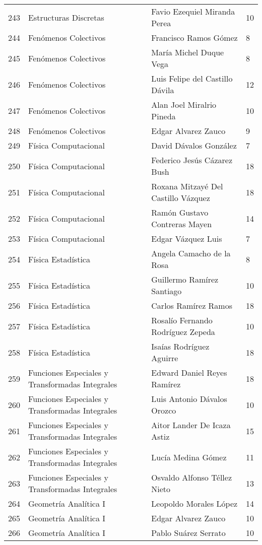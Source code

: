 \begin{table}[ht]
\begin{tabular}{rlll}
  243 & Estructuras Discretas & Favio Ezequiel Miranda Perea & 10 \\ 
  244 & Fenómenos Colectivos & Francisco Ramos Gómez & 8 \\ 
  245 & Fenómenos Colectivos & María Michel Duque Vega & 8 \\ 
  246 & Fenómenos Colectivos & Luis Felipe del Castillo Dávila & 12 \\ 
  247 & Fenómenos Colectivos & Alan Joel Miralrio Pineda & 10 \\ 
  248 & Fenómenos Colectivos & Edgar Alvarez Zauco & 9 \\ 
  249 & Física Computacional & David Dávalos González & 7 \\ 
  250 & Física Computacional & Federico Jesús Cázarez Bush & 18 \\ 
  251 & Física Computacional & Roxana Mitzayé Del Castillo Vázquez & 18 \\ 
  252 & Física Computacional & Ramón Gustavo Contreras Mayen & 14 \\ 
  253 & Física Computacional & Edgar Vázquez Luis & 7 \\ 
  254 & Física Estadística & Angela Camacho de la Rosa & 8 \\ 
  255 & Física Estadística & Guillermo Ramírez Santiago & 10 \\ 
  256 & Física Estadística & Carlos Ramírez Ramos & 18 \\ 
  257 & Física Estadística & Rosalío Fernando Rodríguez Zepeda & 10 \\ 
  258 & Física Estadística & Isaías Rodríguez Aguirre & 18 \\ 
  259 & Funciones Especiales y Transformadas Integrales & Edward Daniel Reyes Ramírez & 18 \\ 
  260 & Funciones Especiales y Transformadas Integrales & Luis Antonio Dávalos Orozco & 10 \\ 
  261 & Funciones Especiales y Transformadas Integrales & Aitor Lander De Icaza Astiz & 15 \\ 
  262 & Funciones Especiales y Transformadas Integrales & Lucía Medina Gómez & 11 \\ 
  263 & Funciones Especiales y Transformadas Integrales & Osvaldo Alfonso Téllez Nieto & 13 \\ 
  264 & Geometría Analítica I & Leopoldo Morales López & 14 \\ 
  265 & Geometría Analítica I & Edgar Alvarez Zauco & 10 \\ 
  266 & Geometría Analítica I & Pablo Suárez Serrato & 10 \\ 

\end{tabular}
\end{table}
